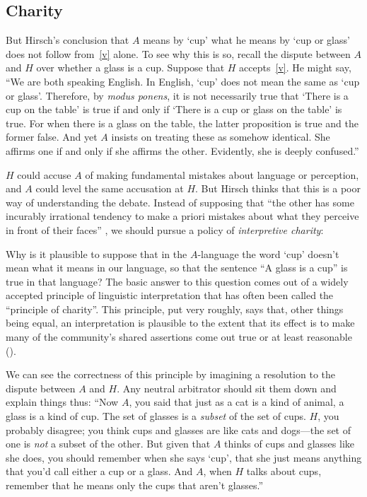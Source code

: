 \documentclass[11pt]{article}
\newenvironment{squote}{%
\begin{spacing}{1}
       	\begin{list}{}{%
\setlength{\labelwidth}{0pt}%
\rightmargin\leftmargin%
}
\item\relax
}{%
\end{list}%
\end{spacing}
}
\begin{document}
\begin{spacing}{1.25}
\subsection{Charity}
\label{charity}
But Hirsch's conclusion that $A$ means by `cup' what he means by `cup
or glass' does not follow from~\ref{v} alone.  To see why this is so,
recall the dispute between $A$ and $H$ over whether a glass is a cup.
Suppose that $H$ accepts~\ref{v}.  He might say, ``We are both
speaking English.  In English, `cup' does not mean the same as `cup or
glass'. Therefore, by {\em modus ponens}, it is not necessarily true
that `There is a cup on the table' is true if and only if `There is a
cup or glass on the table' is true.  For when there is a glass on the
table, the latter proposition is true and the former false.  And yet
$A$ insists on treating these as somehow identical.  She affirms one
if and only if she affirms the other.  Evidently, she is deeply
confused.''

$H$ could accuse $A$ of making fundamental mistakes about language or
perception, and $A$ could level the same accusation at $H$.  But
Hirsch thinks that this is a poor way of understanding the
debate.  Instead of supposing that ``the other has some incurably
irrational tendency to make a priori mistakes about what they perceive
in front of their faces'' \citep[78]{hirsch2005}, we should pursue a
policy of {\em interpretive charity}:

\begin{squote}
Why is it plausible to suppose that in the $A$-language the word `cup'
doesn't mean what it means in our language, so that the sentence ``A
glass is a cup'' is true in that language?  The basic answer to this
question comes out of a widely accepted principle of linguistic
interpretation that has often been called the ``principle of
charity''.  This principle, put very roughly, says that, other things
being equal, an interpretation is plausible to the extent that its
effect is to make many of the community's shared assertions come out
true or at least reasonable (\citeyear[71]{hirsch2005}).
\end{squote}

We can see the correctness of this principle by imagining a resolution
to the dispute between $A$ and $H$.  Any neutral arbitrator should sit
them down and explain things thus: ``Now $A$, you said that just as a
cat is a kind of animal, a glass is a kind of cup.  The set of glasses
is a {\em subset} of the set of cups.  $H$, you probably disagree; you
think cups and glasses are like cats and dogs---the set of one is {\em
  not} a subset of the other.  But given that $A$ thinks of cups and
glasses like she does, you should remember when she says `cup', that
she just means anything that you'd call either a cup or a glass.  And
$A$, when $H$ talks about cups, remember that he means only the cups
that aren't glasses.''


\end{spacing}
\end{document}
